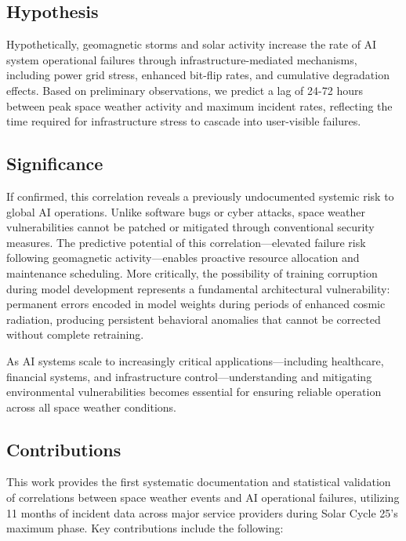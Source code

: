 \documentclass[11pt,a4paper]{article}
\begin{document}
\subsection{Hypothesis}
Hypothetically, geomagnetic storms and solar activity increase the rate of AI system operational failures through infrastructure-mediated mechanisms, including power grid stress, enhanced bit-flip rates, and cumulative degradation effects. Based on preliminary observations, we predict a lag of 24-72 hours between peak space weather activity and maximum incident rates, reflecting the time required for infrastructure stress to cascade into user-visible failures.

\subsection{Significance}
If confirmed, this correlation reveals a previously undocumented systemic risk to global AI operations. Unlike software bugs or cyber attacks, space weather vulnerabilities cannot be patched or mitigated through conventional security measures. The predictive potential of this correlation---elevated failure risk following geomagnetic activity---enables proactive resource allocation and maintenance scheduling. More critically, the possibility of training corruption during model development represents a fundamental architectural vulnerability: permanent errors encoded in model weights during periods of enhanced cosmic radiation, producing persistent behavioral anomalies that cannot be corrected without complete retraining.

As AI systems scale to increasingly critical applications---including healthcare, financial systems, and infrastructure control---understanding and mitigating environmental vulnerabilities becomes essential for ensuring reliable operation across all space weather conditions.

\subsection{Contributions}
This work provides the first systematic documentation and statistical validation of correlations between space weather events and AI operational failures, utilizing 11 months of incident data across major service providers during Solar Cycle 25's maximum phase. Key contributions include the following:
\end{document}
